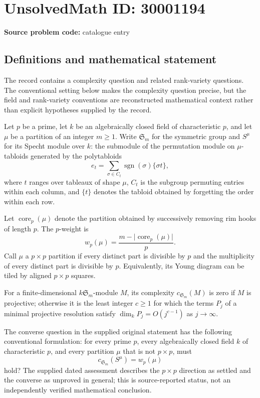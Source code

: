 \documentclass[11pt]{article}
\begin{document}
\section*{UnsolvedMath ID: 30001194}
\textbf{Source problem code:} catalogue entry
\subsection{Definitions and mathematical statement}
The record contains a complexity question and related rank-variety questions. The conventional setting below makes the complexity question precise, but the field and rank-variety conventions are reconstructed mathematical context rather than explicit hypotheses supplied by the record.

Let \(p\) be a prime, let \(k\) be an algebraically closed field of characteristic \(p\), and let \(\mu\) be a partition of an integer \(m\geq 1\). Write \(\mathfrak S_m\) for the symmetric group and \(S^\mu\) for its Specht module over \(k\): the submodule of the permutation module on \(\mu\)-tabloids generated by the polytabloids
\[
e_t=\sum_{\sigma\in C_t}\operatorname{sgn}(\sigma)\{\sigma t\},
\]
where \(t\) ranges over tableaux of shape \(\mu\), \(C_t\) is the subgroup permuting entries within each column, and \(\{t\}\) denotes the tabloid obtained by forgetting the order within each row.

Let \(\operatorname{core}_p(\mu)\) denote the partition obtained by successively removing rim hooks of length \(p\). The \(p\)-weight is
\[
w_p(\mu)=\frac{m-\lvert\operatorname{core}_p(\mu)\rvert}{p}.
\]
Call \(\mu\) a \(p\times p\) partition if every distinct part is divisible by \(p\) and the multiplicity of every distinct part is divisible by \(p\). Equivalently, its Young diagram can be tiled by aligned \(p\times p\) squares.

For a finite-dimensional \(k\mathfrak S_m\)-module \(M\), its complexity \(c_{\mathfrak S_m}(M)\) is zero if \(M\) is projective; otherwise it is the least integer \(c\geq 1\) for which the terms \(P_j\) of a minimal projective resolution satisfy \(\dim_k P_j=O(j^{c-1})\) as \(j\to\infty\).

The converse question in the supplied original statement has the following conventional formulation: for every prime \(p\), every algebraically closed field \(k\) of characteristic \(p\), and every partition \(\mu\) that is not \(p\times p\), must
\[
c_{\mathfrak S_m}(S^\mu)=w_p(\mu)
\]
hold? The supplied dated assessment describes the \(p\times p\) direction as settled and the converse as unproved in general; this is source-reported status, not an independently verified mathematical conclusion.
\end{document}
